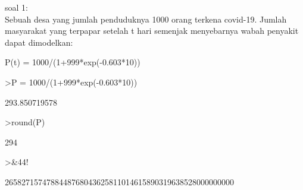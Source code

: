 \documentclass[12pt,arial,letterpaper]{book}
\begin{document}
\begin{eulernootebook}
\begin{eulercomment}
\begin{eulercomment}
\begin{eulercomment}
soal 1:\\
Sebuah desa yang jumlah penduduknya 1000 orang terkena covid-19.
Jumlah masyarakat yang terpapar setelah t hari semenjak menyebarnya
wabah penyakit dapat dimodelkan:

P(t) = 1000/(1+999*exp(-0.603*10))
\end{eulercomment}
\begin{eulerprompt}
>P = 1000/(1+999*exp(-0.603*10))
\end{eulerprompt}
\begin{euleroutput}
  293.850719578
\end{euleroutput}
\begin{eulerprompt}
>round(P)
\end{eulerprompt}
\begin{euleroutput}
  294
\end{euleroutput}
\begin{eulerprompt}
>&44!
\end{eulerprompt}
\begin{euleroutput}
  
          2658271574788448768043625811014615890319638528000000000
  

\end{euleroutput}
\end{eulercomment}
\end{eulercomment}
\end{eulernootebook}
\end{document}
